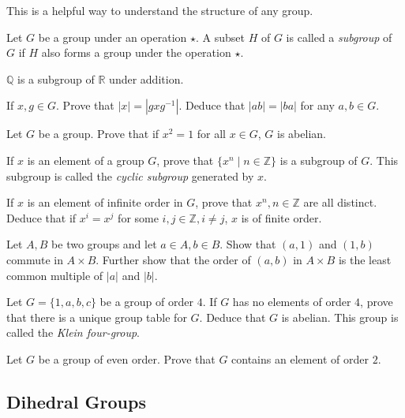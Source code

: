 This is a helpful way to understand the structure of any group.

\begin{definition}
Let $G$ be a group under an operation $\star$. A subset $H$ of $G$ is called a \textit{subgroup} of $G$ if $H$ also forms a group under the operation $\star$.
\end{definition}

\begin{example}
$\mathbb{Q}$ is a subgroup of $\mathbb{R}$ under addition.
\end{example}

\begin{exercise}
    If $x,g\in G$. Prove that $|x|=|gxg^{-1}|$. Deduce that $|ab|=|ba|$ for any $a,b\in G$.
\end{exercise}
\begin{exercise}
    Let $G$ be a group. Prove that if $x^2=1$ for all $x\in G$, $G$ is abelian.
\end{exercise}
\begin{exercise}
    If $x$ is an element of a group $G$, prove that $\{x^n\mid n\in\mathbb{Z}\}$ is a subgroup of $G$. This subgroup is called the \textit{cyclic subgroup} generated by $x$.
\end{exercise}
\begin{exercise}
    If $x$ is an element of infinite order in $G$, prove that $x^n, n\in\mathbb{Z}$ are all distinct. Deduce that if $x^i=x^j$ for some $i,j\in\mathbb{Z}, i\neq j$, $x$ is of finite order.
\end{exercise}
\begin{exercise}
    Let $A,B$ be two groups and let $a\in A, b\in B$. Show that $(a,1)$ and $(1,b)$ commute in $A\times B$. Further show that the order of $(a,b)$ in $A\times B$ is the least common multiple of $|a|$ and $|b|$.
\end{exercise}
\begin{exercise}
\label{k4q1}
    Let $G=\{1,a,b,c\}$ be a group of order $4$. If $G$ has no elements of order $4$, prove that there is a unique group table for $G$. Deduce that $G$ is abelian. This group is called the \textit{Klein four-group}.
\end{exercise}

\begin{exercise}
    Let $G$ be a group of even order. Prove that $G$ contains an element of order $2$.
\end{exercise}

\subsection{Dihedral Groups}

